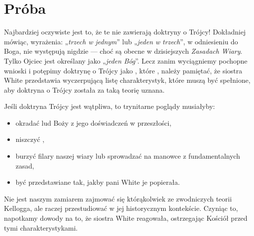 \section*{Próba}

Najbardziej oczywiste jest to, że te  nie zawierają doktryny o Trójcy! Dokładniej mówiąc, wyrażenia: „\textit{trzech w jednym}” lub „\textit{jeden w trzech}”, w odniesieniu do Boga, nie występują nigdzie — choć są obecne w dzisiejszych \textit{Zasadach Wiary}. Tylko Ojciec jest określany jako „\textit{jeden Bóg}”. Lecz zanim wyciągniemy pochopne wnioski i potępimy doktrynę o Trójcy jako , które , należy pamiętać, że siostra White przedstawia wyczerpującą listę charakterystyk, które muszą być spełnione, aby doktryna o Trójcy została za taką teorię uznana.

Jeśli doktryna Trójcy jest wątpliwa, to trynitarne poglądy musiałyby:
\begin{itemize}
    \item okradać lud Boży z jego doświadczeń w przeszłości,
    \item niszczyć ,
    \item burzyć filary naszej wiary lub sprowadzać na manowce z fundamentalnych zasad,
    \item być przedstawiane tak, jakby pani White je popierała.
\end{itemize}

Nie jest naszym zamiarem zajmować się którąkolwiek ze zwodniczych teorii Kellogga, ale raczej przestudiować  w jej historycznym kontekście. Czyniąc to, napotkamy dowody na to, że siostra White reagowała, ostrzegając Kościół przed tymi charakterystykami.




